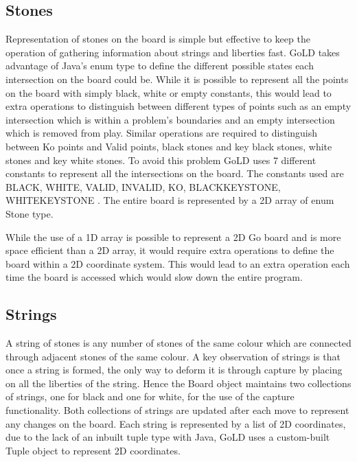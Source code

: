 \documentclass{l4proj}
\begin{document}
\subsection{Stones}
Representation of stones on the board is simple but effective to keep the operation of gathering information about strings and liberties fast. GoLD takes advantage of Java’s enum type to define the different possible states each intersection on the board could be. While it is possible to represent all the points on the board with simply black, white or empty constants, this would lead to extra operations to distinguish between different types of points such as an empty intersection which is within a problem’s boundaries and an empty intersection which is removed from play. Similar operations are required to distinguish between Ko points and Valid points, black stones and key black stones, white stones and key white stones. To avoid this problem GoLD uses 7 different constants to represent all the intersections on the board. The constants used are BLACK, WHITE, VALID, INVALID, KO, BLACKKEYSTONE, WHITEKEYSTONE . The entire board is represented by a 2D array of enum Stone type.

While the use of a 1D array is possible to represent a 2D Go board and is more space efficient than a 2D array, it would require extra operations to define the board within a 2D coordinate system. This would lead to an extra operation each time the board is accessed which would slow down the entire program.

\subsection{Strings}
A string of stones is any number of stones of the same colour which are connected through adjacent stones of the same colour. A key observation of strings is that once a string is formed, the only way to deform it is through capture by placing on all the liberties of the string. Hence the Board object maintains two collections of strings, one for black and one for white, for the use of the capture functionality. Both collections of strings are updated after each move to represent any changes on the board. Each string is represented by a list of 2D coordinates, due to the lack of an inbuilt tuple type with Java, GoLD uses a custom-built Tuple object to represent 2D coordinates.
\end{document}
